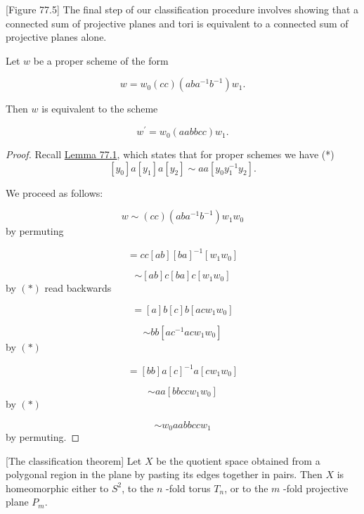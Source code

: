 [Figure 77.5]
The final step of our classification procedure involves showing that a connected sum of projective planes and tori is equivalent to a connected sum of projective planes alone.
\begin{lemma}
\label{lem:\thetheorem}
	Let \(w\) be a proper scheme of the form

\[
w = w_{0}( {cc}) ( {{ab}a^{-1}b^{-1}}) w_{1}.
\]

Then \(w\) is equivalent to the scheme

\[
w^{\prime } = w_{0}( {aabbcc}) w_{1}.
\]
\end{lemma}

\begin{proof}
	Recall \hyperref[lem:77.1]{Lemma 77.1}, which states that for proper schemes we have
(*)
\[
[ y_{0}] a[ y_{1}] a[ y_{2}] \sim {aa}[ {y_{0}y_1^{-1}y_{2}}] .
\]

We proceed as follows:

\[
w \sim ( {cc}) ( {{ab}a^{-1}b^{-1}}) w_{1}w_{0}
\]
by permuting

\[
= {cc}[ {ab}] {[ ba] }^{-1}[ {w_{1}w_{0}}]
\]

\[
\sim [ {ab}] c[ {ba}] c[ {w_{1}w_{0}}]
\]
by \(( *)\) read backwards

\[
= [ a] b[ c] b[ {{ac}w_{1}w_{0}}]
\]

\[
\sim {bb}[ {ac^{-1}{ac}w_{1}w_{0}}]
\]
by \((*)\)

\[
= [ {bb}] a{[ c] }^{-1}a[ {cw_{1}w_{0}}]
\]

\[
\sim {aa}[ {{bbcc}w_{1}w_{0}}]
\]
by \((*)\)

\[
\sim {w}_{0}{aabbcc}w_{1}
\]
by permuting.
\end{proof}

\begin{theorem}
\label{thm:\thetheorem}[The classification theorem]
	Let \(X\) be the quotient space obtained from a polygonal region in the plane by pasting its edges together in pairs. Then \(X\) is homeomorphic either to \(S^{2}\), to the \(n\) -fold torus \(T_{n}\), or to the \(m\) -fold projective plane \(P_{m}\).
\end{theorem}


